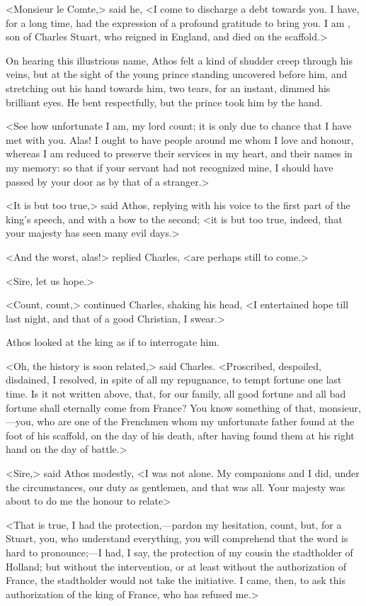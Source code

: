<Monsieur le Comte,> said he, <I come to discharge a debt towards you. I have, for a long time, had the expression of a profound gratitude to bring you. I am , son of Charles Stuart, who reigned in England, and died on the scaffold.>

On hearing this illustrious name, Athos felt a kind of shudder creep through his veins, but at the sight of the young prince standing uncovered before him, and stretching out his hand towards him, two tears, for an instant, dimmed his brilliant eyes. He bent respectfully, but the prince took him by the hand.

<See how unfortunate I am, my lord count; it is only due to chance that I have met with you. Alas! I ought to have people around me whom I love and honour, whereas I am reduced to preserve their services in my heart, and their names in my memory: so that if your servant had not recognized mine, I should have passed by your door as by that of a stranger.>

<It is but too true,> said Athos, replying with his voice to the first part of the king's speech, and with a bow to the second; <it is but too true, indeed, that your majesty has seen many evil days.>

<And the worst, alas!> replied Charles, <are perhaps still to come.>

<Sire, let us hope.>

<Count, count,> continued Charles, shaking his head, <I entertained hope till last night, and that of a good Christian, I swear.>

Athos looked at the king as if to interrogate him.

<Oh, the history is soon related,> said Charles. <Proscribed, despoiled, disdained, I resolved, in spite of all my repugnance, to tempt fortune one last time. Is it not written above, that, for our family, all good fortune and all bad fortune shall eternally come from France? You know something of that, monsieur,—you, who are one of the Frenchmen whom my unfortunate father found at the foot of his scaffold, on the day of his death, after having found them at his right hand on the day of battle.>

<Sire,> said Athos modestly, <I was not alone. My companions and I did, under the circumstances, our duty as gentlemen, and that was all. Your majesty was about to do me the honour to relate\longdash>

<That is true, I had the protection,—pardon my hesitation, count, but, for a Stuart, you, who understand everything, you will comprehend that the word is hard to pronounce;—I had, I say, the protection of my cousin the stadtholder of Holland; but without the intervention, or at least without the authorization of France, the stadtholder would not take the initiative. I came, then, to ask this authorization of the king of France, who has refused me.>

